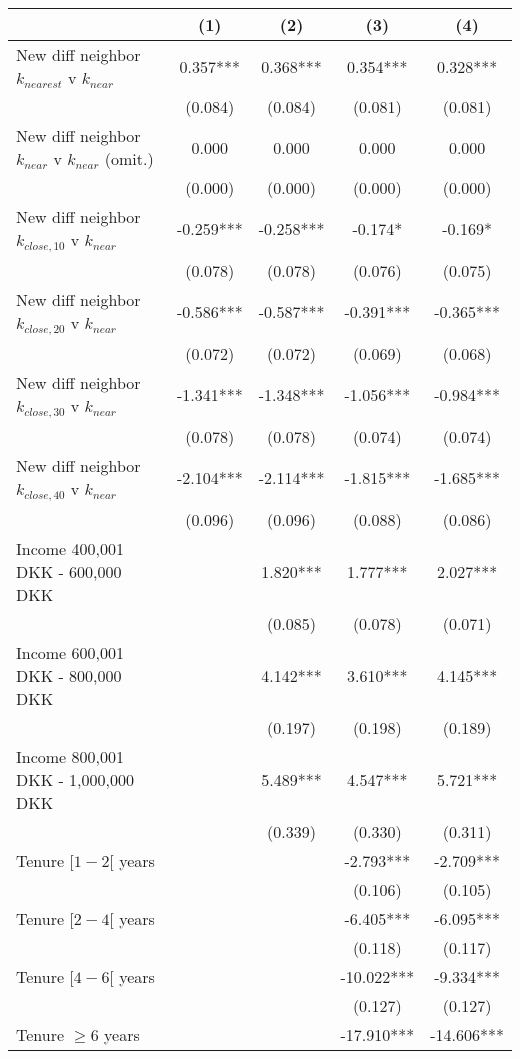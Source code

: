 \begin{tabular}{lcccc}
\toprule
  & (1) & (2) & (3) & (4) \\ 
\midrule
New diff neighbor $k_{nearest}$ v $k_{near}$ & 0.357*** & 0.368*** & 0.354*** & 0.328*** \\ 
 & (0.084) & (0.084) & (0.081) & (0.081) \\ 
New diff neighbor $k_{near}$ v $k_{near}$ (omit.) & 0.000 & 0.000 & 0.000 & 0.000 \\ 
 & (0.000) & (0.000) & (0.000) & (0.000) \\ 
New diff neighbor $k_{close,10}$ v $k_{near}$ & -0.259*** & -0.258*** & -0.174* & -0.169* \\ 
 & (0.078) & (0.078) & (0.076) & (0.075) \\ 
New diff neighbor $k_{close,20}$ v $k_{near}$ & -0.586*** & -0.587*** & -0.391*** & -0.365*** \\ 
 & (0.072) & (0.072) & (0.069) & (0.068) \\ 
New diff neighbor $k_{close,30}$ v $k_{near}$ & -1.341*** & -1.348*** & -1.056*** & -0.984*** \\ 
 & (0.078) & (0.078) & (0.074) & (0.074) \\ 
New diff neighbor $k_{close,40}$ v $k_{near}$ & -2.104*** & -2.114*** & -1.815*** & -1.685*** \\ 
 & (0.096) & (0.096) & (0.088) & (0.086) \\ 
Income 400,001 DKK - 600,000 DKK &  & 1.820*** & 1.777*** & 2.027*** \\ 
 &  & (0.085) & (0.078) & (0.071) \\ 
Income 600,001 DKK - 800,000 DKK &  & 4.142*** & 3.610*** & 4.145*** \\ 
 &  & (0.197) & (0.198) & (0.189) \\ 
Income 800,001 DKK - 1,000,000 DKK &  & 5.489*** & 4.547*** & 5.721*** \\ 
 &  & (0.339) & (0.330) & (0.311) \\ 
Tenure $[1-2[$ years &  &  & -2.793*** & -2.709*** \\ 
 &  &  & (0.106) & (0.105) \\ 
Tenure $[2-4[$ years &  &  & -6.405*** & -6.095*** \\ 
 &  &  & (0.118) & (0.117) \\ 
Tenure $[4-6[$ years &  &  & -10.022*** & -9.334*** \\ 
 &  &  & (0.127) & (0.127) \\ 
Tenure $\geq 6$ years &  &  & -17.910*** & -14.606*** \\ 

\end{tabular}
